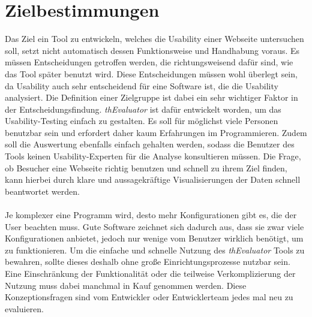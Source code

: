 %
%
%
%


\section{Zielbestimmungen}

Das Ziel ein Tool zu entwickeln, welches die Usability einer Webseite untersuchen soll, setzt nicht automatisch dessen Funktionsweise und Handhabung voraus. Es müssen Entscheidungen getroffen werden, die richtungsweisend dafür sind, wie das Tool später benutzt wird. Diese Entscheidungen müssen wohl überlegt sein, da Usability auch sehr entscheidend für eine Software ist, die die Usability analysiert. Die Definition einer Zielgruppe ist dabei ein sehr wichtiger Faktor in der Entscheidungsfindung. \textit{thEvaluator} ist dafür entwickelt worden, um das Usability-Testing einfach zu gestalten. Es soll für möglichst viele Personen benutzbar sein und erfordert daher kaum Erfahrungen im Programmieren. Zudem soll die Auswertung ebenfalls einfach gehalten werden, sodass die Benutzer des Tools keinen Usability-Experten für die Analyse konsultieren müssen. Die Frage, ob Besucher eine Webseite richtig benutzen und schnell zu ihrem Ziel finden, kann hierbei durch klare und aussagekräftige Visualisierungen der Daten schnell beantwortet werden.\\
\\
Je komplexer eine Programm wird, desto mehr Konfigurationen gibt es, die der User beachten muss. Gute Software zeichnet sich dadurch aus, dass sie zwar viele Konfigurationen anbietet, jedoch nur wenige vom Benutzer wirklich benötigt, um zu funktionieren. Um die einfache und schnelle Nutzung des \textit{thEvaluator} Tools zu bewahren, sollte dieses deshalb ohne große Einrichtungsprozesse nutzbar sein. Eine Einschränkung der Funktionalität oder die teilweise Verkomplizierung der Nutzung muss dabei manchmal in Kauf genommen werden. Diese Konzeptionsfragen sind vom Entwickler oder Entwicklerteam jedes mal neu zu evaluieren.\\
\\
